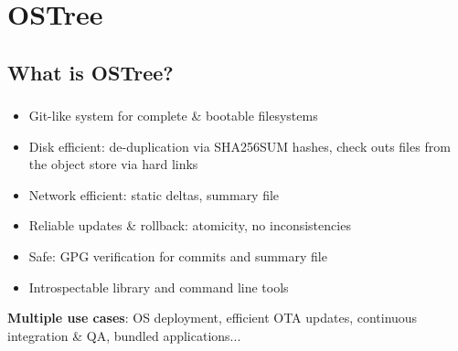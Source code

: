 %
%
%

\section{OSTree}
\subsection{What is OSTree?}

\begin{frame}
  \frametitle{\insertsubsection}

  \begin{itemize}
  \item Git-like system for complete \& bootable filesystems\vspacing
  \item Disk efficient: de-duplication via SHA256SUM hashes, check outs files from the object store via hard links\vspacing
  \item Network efficient: static deltas, summary file\vspacing
  \item Reliable updates \& rollback: atomicity, no inconsistencies\vspacing
  \item Safe: GPG verification for commits and summary file\vspacing
  \item Introspectable library and command line tools
  \end{itemize}

  \begin{flushleft}
    \textbf{Multiple use cases}: OS deployment, efficient OTA updates, continuous integration \& QA, bundled applications...
  \end{flushleft}
\end{frame}

